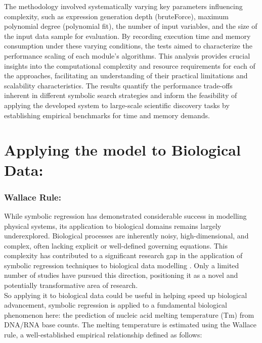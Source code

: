 \documentclass{article}
\begin{document}
The methodology involved systematically varying key parameters influencing complexity, such as expression generation depth (bruteForce), maximum polynomial degree (polynomial fit), the number of input variables, and the size of the input data sample for evaluation. By recording execution time and memory consumption under these varying conditions, the tests aimed to characterize the performance scaling of each module's algorithms. This analysis provides crucial insights into the computational complexity and resource requirements for each of the approaches, facilitating an understanding of their practical limitations and scalability characteristics. The results quantify the performance trade-offs inherent in different symbolic search strategies and inform the feasibility of applying the developed system to large-scale scientific discovery tasks by establishing empirical benchmarks for time and memory demands.\\





\section{ Applying the model to Biological Data: }




\subsubsection{Wallace Rule: }

While symbolic regression has demonstrated considerable success in modelling physical systems, its application to biological domains remains largely underexplored. Biological processes are inherently noisy, high-dimensional, and complex, often lacking explicit or well-defined governing equations. This complexity has contributed to a significant research gap in the application of symbolic regression techniques to biological data modelling \cite{willard2022}. Only a limited number of studies have pursued this direction, positioning it as a novel and potentially transformative area of research.\\

So applying it to biological data could be useful in helping speed up biological advancement, symbolic regression is applied to a fundamental biological phenomenon here: the prediction of nucleic acid melting temperature (Tm) from DNA/RNA base counts. The melting temperature is estimated using the Wallace rule, a well-established empirical relationship defined as follows:\\
\end{document}
